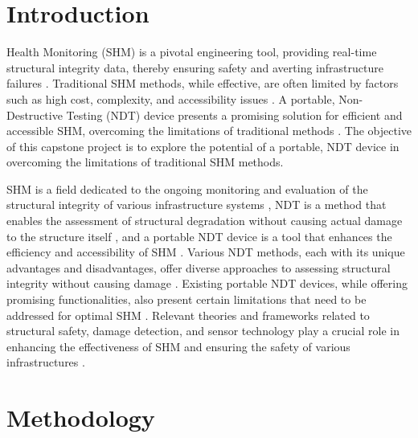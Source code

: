 \documentclass[journal, a4paper]{IEEEtran}
\begin{document}
\section{Introduction}
 Health Monitoring (SHM) is a pivotal engineering tool, providing real-time structural integrity data,
thereby ensuring safety and averting infrastructure failures \cite{Gharehbaghi2022} \cite{Katam2023}.
Traditional SHM methods, while effective, are often limited by factors such as
high cost, complexity, and accessibility issues \cite{Katam2023} \cite{Gharehbaghi2022}.
A portable, Non-Destructive Testing (NDT) device presents a promising solution for efficient and accessible SHM,
overcoming the limitations of traditional methods \cite{Guo2022} \cite{Chen2023}.
The objective of this capstone project is to explore the potential of a portable,
NDT device in overcoming the limitations of traditional SHM methods.

SHM is a field dedicated to the ongoing monitoring and evaluation of the structural integrity
of various infrastructure systems \cite{Katam2023}, NDT is a method that enables the assessment
of structural degradation without causing actual damage to the structure itself \cite{Katam2023},
and a portable NDT device is a tool that enhances the efficiency and accessibility of SHM \cite{Hassani2023} \cite{Katam2023}.
Various NDT methods, each with its unique advantages and disadvantages,
offer diverse approaches to assessing structural integrity without causing damage \cite{Dolati2021} \cite{Verma2013}.
Existing portable NDT devices, while offering promising functionalities,
also present certain limitations that need to be addressed for optimal SHM \cite{Hassani2023} \cite{Zhu2011}.
Relevant theories and frameworks related to structural safety, damage detection,
and sensor technology play a crucial role in enhancing the effectiveness of SHM
and ensuring the safety of various infrastructures \cite{Chen2021} \cite{Gharehbaghi2022}.


\section{Methodology}
\lipsum[3]
\end{document}
